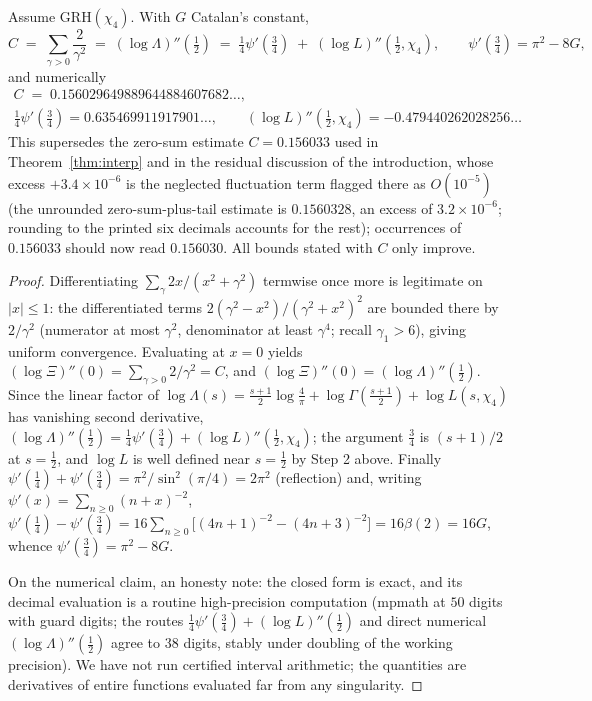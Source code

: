 \begin{corollary}\label{cor:Cexact}
Assume GRH$(\chi_4)$. With $G$ Catalan's constant,
\[
C\;=\;\sum_{\gamma>0}\frac{2}{\gamma^2}
\;=\;(\log\Lambda)''(\tfrac12)
\;=\;\tfrac14\psi'(\tfrac34)\;+\;(\log L)''(\tfrac12,\chi_4),
\qquad
\psi'(\tfrac34)=\pi^2-8G,
\]
and numerically
\begin{gather*}
C\;=\;0.156029649889644884607682\ldots,\\
\tfrac14\psi'(\tfrac34)=0.635469911917901\ldots,\qquad
(\log L)''(\tfrac12,\chi_4)=-0.479440262028256\ldots
\end{gather*}
This supersedes the zero-sum estimate $C=0.156033$ used in
Theorem~\ref{thm:interp} and in the residual discussion of the
introduction, whose excess $+3.4\times10^{-6}$ is the neglected
fluctuation term flagged there as $O(10^{-5})$ (the unrounded
zero-sum-plus-tail estimate is $0.1560328$, an excess of
$3.2\times10^{-6}$; rounding to the printed six decimals accounts for
the rest); occurrences
of $0.156033$ should now read $0.156030$. All bounds stated with $C$
only improve.
\end{corollary}

\begin{proof}
Differentiating $\sum_\gamma 2x/(x^2+\gamma^2)$ termwise once more is
legitimate on $|x|\le1$: the differentiated terms
$2(\gamma^2-x^2)/(\gamma^2+x^2)^2$ are bounded there by $2/\gamma^2$
(numerator at most $\gamma^2$, denominator at least $\gamma^4$; recall
$\gamma_1>6$), giving uniform convergence. Evaluating at $x=0$ yields
$(\log\Xi)''(0)=\sum_{\gamma>0}2/\gamma^2=C$, and
$(\log\Xi)''(0)=(\log\Lambda)''(\tfrac12)$. Since the linear factor of
$\log\Lambda(s)=\tfrac{s+1}2\log\tfrac4\pi+\log\Gamma(\tfrac{s+1}2)
+\log L(s,\chi_4)$ has vanishing second derivative,
$(\log\Lambda)''(\tfrac12)=\tfrac14\psi'(\tfrac34)
+(\log L)''(\tfrac12,\chi_4)$; the argument $\tfrac34$ is
$(s+1)/2$ at $s=\tfrac12$, and $\log L$ is well defined near
$s=\tfrac12$ by Step 2 above. Finally
$\psi'(\tfrac14)+\psi'(\tfrac34)=\pi^2/\sin^2(\pi/4)=2\pi^2$
(reflection) and, writing $\psi'(x)=\sum_{n\ge0}(n+x)^{-2}$,
$\psi'(\tfrac14)-\psi'(\tfrac34)
=16\sum_{n\ge0}\bigl[(4n+1)^{-2}-(4n+3)^{-2}\bigr]=16\beta(2)=16G$,
whence $\psi'(\tfrac34)=\pi^2-8G$.

On the numerical claim, an honesty note: the closed form is exact, and
its decimal evaluation is a routine high-precision computation (mpmath
at $50$ digits with guard digits; the routes
$\tfrac14\psi'(\tfrac34)+(\log L)''(\tfrac12)$ and direct numerical
$(\log\Lambda)''(\tfrac12)$ agree to $38$ digits, stably under
doubling of the working precision). We have not run certified interval
arithmetic; the quantities are derivatives of entire functions
evaluated far from any singularity.
\end{proof}

